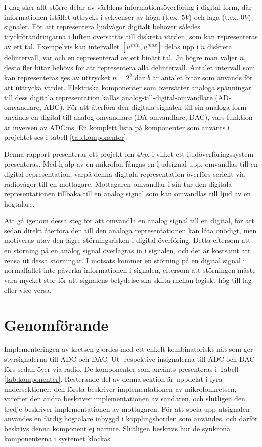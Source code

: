 \documentclass[a4paper,10pt]{article}
\begin{document}
I dag sker allt större delar av världens informationsöverföring i digital form, 
där informationen istället uttrycks i sekvenser av höga (t.ex. $5V$) och låga
(t.ex. $0V$) signaler. För att representera ljudvågor digitalt behöver således 
tryckförändringarna i luften översättas till diskreta värden, som kan 
representeras av ett tal.
Exempelvis kan intervallet $[u^{min}, u^{max}]$ delas upp i $n$ diskreta 
delintervall, var och en representerad av ett binärt tal. Ju högre man väljer
$n$, desto fler bitar behövs för att representera alla delintervall. Antalet 
intervall som kan representeras ges av uttrycket $n = 2^b$ där $b$ är antalet 
bitar som används för att uttrycka värdet. Elektriska komponenter som översätter
analoga spänningar till dess digitala representation kallas 
analog-till-digital-omvandlare (AD-omvandlare, ADC). 
För att återföra den digitala signalen till sin analoga form används en
digital-till-analog-omvandlare (DA-omvandlare, DAC), vars funktion är
inversen av ADC:ns. En komplett lista på komponenter som använts i projektet ses i tabell \ref{tab:komponenter}.

Denna rapport presenterar ett projekt om $4 hp$, i vilket ett 
ljudöverföringssystem presenteras. Med hjälp av en mikrofon fångas en 
ljudsignal upp, omvandlas till en digital representation, varpå denna digitala 
representation överförs seriellt via radiovågor till en mottagare. Mottagaren omvandlar i 
sin tur den digitala representationen tillbaka till en analog signal 
som kan omvandlas till ljud av en högtalare.

Att gå igenom dessa steg för att omvandla en analog signal till en digital, för
att sedan direkt återföra den till den analoga representationen kan låta 
onödigt, men motiveras utav den lägre störningsrisken i digital överföring. 
Detta eftersom att en störning på en analog signal överlagras in i signalen, och
det är kostsamt att rensa ut dessa störningar. I motsats kommer en störning på
en digital signal i normalfallet inte påverka informationen i signalen, eftersom
att störningen måste vara mycket stor för att signalens betydelse ska skifta
mellan logiskt hög till låg eller vice versa.


\section{Genomförande}

Implementeringen av kretsen gjordes med ett enkelt kombinatoriskt nät som ger
styrsignalerna till ADC och DAC. Ut- respektive insignalerna till ADC och DAC
förs sedan över via radio. De komponenter som använts presenteras i Tabell 
\ref{tab:komponenter}. Resterande del av denna sektion är uppdelat i fyra
undersektioner, den första beskriver implementationen av mikrofonkretsen, 
varefter den andra beskriver implementationen av sändaren, och slutligen den 
tredje beskriver implementationen av mottagaren. För att spela upp
utsignalen användes en färdig högtalare inbyggd i kopplingsborden som användes,
och därför beskrivs denna komponent ej närmre. Slutligen beskrivs hur de 
synkrona komponenterna i systemet klockas.
\end{document}
